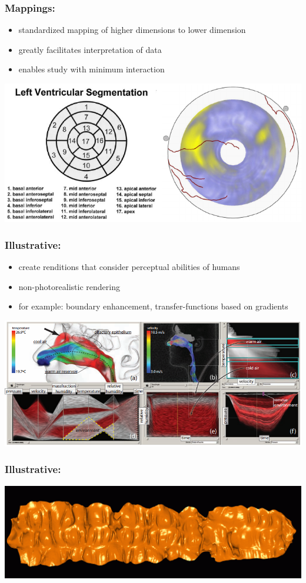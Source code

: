 \documentclass{beamer}
\begin{document}
\begin{frame}
	\frametitle{Mappings:}
	\begin{itemize}
		\item standardized mapping of higher dimensions to lower dimension
		\item greatly facilitates interpretation of data
		\item enables study with minimum interaction
	\end{itemize}
	\includegraphics[width=\textwidth]{images/heart}
\end{frame}

\begin{frame}
	\frametitle{Illustrative:} %
	\begin{itemize}
		\item create renditions that consider perceptual abilities of humans
		\item non-photorealistic rendering
		\item for example: boundary enhancement, transfer-functions based on
gradients
	\end{itemize}
	\includegraphics[width=\textwidth]{images/nose}
\end{frame}

\begin{frame}
	\frametitle{Illustrative:} %
	\includegraphics[width=\textwidth]{images/colon}
\end{frame}
\end{document}
